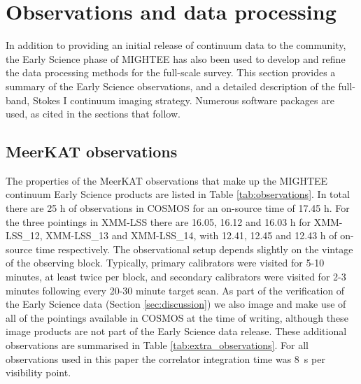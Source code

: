\documentclass[usenatbib,usedcolumn]{mnras}
\begin{document}
\section{Observations and data processing}
\label{sec:obs_and_proc}

In addition to providing an initial release of continuum data to the community, the Early Science phase of MIGHTEE has also been used to develop and refine the data processing methods for the full-scale survey. This section provides a summary of the Early Science observations, and a detailed description of the full-band, Stokes I continuum imaging strategy. Numerous software packages are used, as cited in the sections that follow. 

\subsection{MeerKAT observations}
\label{sec:observations}

The properties of the MeerKAT observations that make up the MIGHTEE continuum Early Science products are listed in Table \ref{tab:observations}. In total there are 25 h of observations in COSMOS for an on-source time of 17.45 h. For the three pointings in XMM-LSS there are 16.05, 16.12 and 16.03 h for XMM-LSS\_12, XMM-LSS\_13 and XMM-LSS\_14, with 12.41, 12.45 and 12.43 h of on-source time respectively. The observational setup depends slightly on the vintage of the observing block. Typically, primary calibrators were visited for 5-10 minutes, at least twice per block, and secondary calibrators were visited for 2-3 minutes following every 20-30 minute target scan. As part of the verification of the Early Science data (Section \ref{sec:discussion}) we also image and make use of all of the pointings available in COSMOS at the time of writing, although these image products are not part of the Early Science data release. These additional observations are summarised in Table \ref{tab:extra_observations}. For all observations used in this paper the correlator integration time was 8~s per visibility point.
\end{document}
